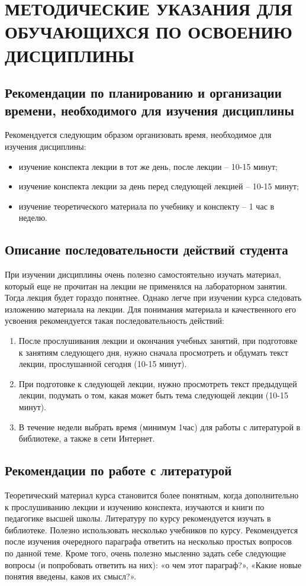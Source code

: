 \chapter{МЕТОДИЧЕСКИЕ УКАЗАНИЯ ДЛЯ ОБУЧАЮЩИХСЯ ПО ОСВОЕНИЮ ДИСЦИПЛИНЫ}
\label{chapt9}

\section{Рекомендации по планированию и организации времени, необходимого для изучения дисциплины}
Рекомендуется следующим образом организовать время, необходимое для изучения дисциплины:
\begin{itemize}
\item изучение конспекта лекции в тот же день, после лекции – 10-15 минут;
\item изучение конспекта лекции за день перед следующей лекцией – 10-15 минут;
\item изучение теоретического материала по учебнику и конспекту – 1 час в неделю.
\end{itemize}

\section{Описание последовательности действий студента}
При изучении дисциплины очень полезно самостоятельно изучать материал, который еще не прочитан на лекции не применялся на лабораторном занятии. Тогда лекция будет гораздо понятнее. Однако легче при изучении курса следовать изложению материала на лекции. Для понимания материала и качественного его усвоения рекомендуется такая последовательность действий:
\begin{enumerate}
\item После прослушивания лекции и окончания учебных занятий, при подготовке к занятиям следующего дня, нужно сначала просмотреть и обдумать текст лекции, прослушанной сегодня (10-15 минут).
\item При подготовке к следующей лекции, нужно просмотреть текст предыдущей лекции, подумать о том, какая может быть тема следующей лекции (10-15 минут).
\item В течение недели выбрать время (минимум 1час) для работы с литературой в библиотеке, а также в сети Интернет.
\end{enumerate}
\section{Рекомендации по работе с литературой}
Теоретический материал курса становится более понятным, когда дополнительно к прослушиванию лекции и изучению конспекта, изучаются и книги по педагогике высшей школы. Литературу по курсу рекомендуется изучать в библиотеке. Полезно использовать несколько учебников по курсу. Рекомендуется после изучения очередного параграфа ответить на несколько простых вопросов по данной теме. Кроме того, очень полезно мысленно задать себе следующие вопросы (и попробовать ответить на них): «о чем этот параграф?», «Какие новые понятия введены, каков их смысл?».
